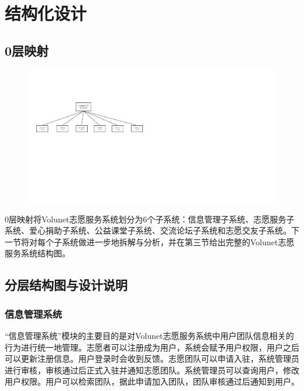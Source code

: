 \section{结构化设计}

\subsection{0层映射}

    \begin{figure}[H]
        \centering       \includegraphics[scale=0.6]{fig/struct_0.pdf}
        \label{fig:volunet}
    \end{figure}

0层映射将Volunet志愿服务系统划分为6个子系统：信息管理子系统、志愿服务子系统、爱心捐助子系统、公益课堂子系统、交流论坛子系统和志愿交友子系统。下一节将对每个子系统做进一步地拆解与分析，并在第三节给出完整的Volunet志愿服务系统结构图。

\subsection{分层结构图与设计说明}
\subsubsection{信息管理系统}



“信息管理系统”模块的主要目的是对Volunet志愿服务系统中用户团队信息相关的行为进行统一地管理。志愿者可以注册成为用户，系统会赋予用户权限，用户之后可以更新注册信息。用户登录时会收到反馈。志愿团队可以申请入驻，系统管理员进行审核，审核通过后正式入驻并通知志愿团队。系统管理员可以查询用户，修改用户权限。用户可以检索团队，据此申请加入团队，团队审核通过后通知到用户。

